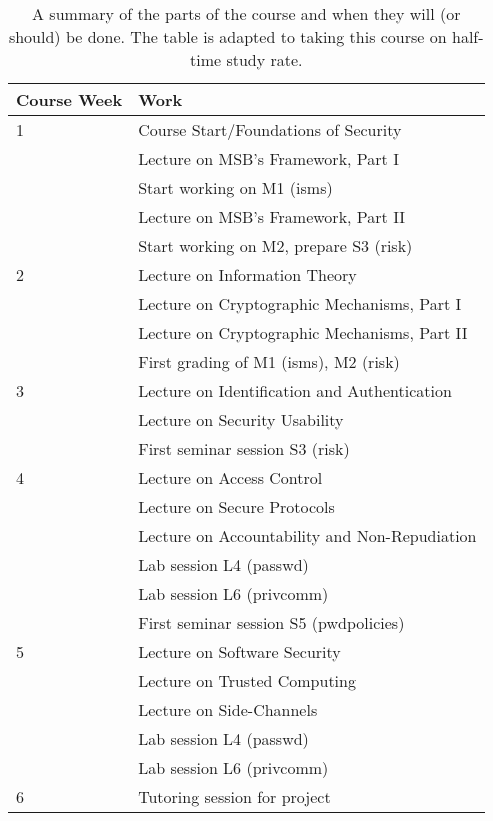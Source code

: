 \documentclass[a4paper]{llncs}
\begin{document}
\begin{table}
	\centering
  \caption{%
    A summary of the parts of the course and when they will (or should) be 
    done.
    The table is adapted to taking this course on half-time study rate.
  }\label{Schedule}
  \begin{tabular}{lp{9cm}}
    \toprule
    \textbf{Course Week}	& \textbf{Work} \\
    \midrule
    1
      & Course Start/Foundations of Security\\
      & Lecture on MSB's Framework, Part I\\
      & Start working on M1 (isms)\\
      & Lecture on MSB's Framework, Part II\\
      & Start working on M2, prepare S3 (risk)\\
    \midrule
    2
      & Lecture on Information Theory\\
      & Lecture on Cryptographic Mechanisms, Part I\\
      & Lecture on Cryptographic Mechanisms, Part II\\
      & First grading of M1 (isms), M2 (risk)\\
    \midrule
    3
      & Lecture on Identification and Authentication\\
      & Lecture on Security Usability\\
      & First seminar session S3 (risk)\\
    \midrule
    4
      & Lecture on Access Control\\
      & Lecture on Secure Protocols\\
      & Lecture on Accountability and Non-Repudiation\\
      & Lab session L4 (passwd)\\
      & Lab session L6 (privcomm)\\
      & First seminar session S5 (pwdpolicies)\\
    \midrule
    5
      & Lecture on Software Security\\
      & Lecture on Trusted Computing\\
      & Lecture on Side-Channels\\
      & Lab session L4 (passwd)\\
      & Lab session L6 (privcomm)\\
    \midrule
    6
      & Tutoring session for project\\

\end{tabular}
\end{table}
\end{document}
